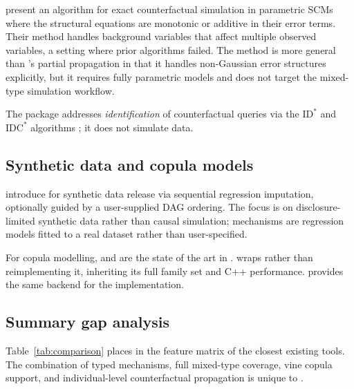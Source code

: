 \documentclass[article]{jss}
\begin{document}
\citet{karvanen2024simcf} present an algorithm for exact counterfactual simulation
in parametric SCMs where the structural equations are monotonic or additive in
their error terms. Their method handles background variables that affect multiple
observed variables, a setting where prior algorithms failed. The method is more
general than 's partial propagation in that it handles
non-Gaussian error structures explicitly, but it requires fully parametric models
and does not target the mixed-type simulation workflow.

The  package \citep{tikka2022cfid} addresses \emph{identification} of
counterfactual queries via the $\mathrm{ID}^*$ and $\mathrm{IDC}^*$ algorithms
\citep{shpitser2007id}; it does not simulate data.

\subsection{Synthetic data and copula models}

\citet{nowok2016synthpop} introduce  for synthetic data release via
sequential regression imputation, optionally guided by a user-supplied DAG ordering.
The focus is on disclosure-limited synthetic data rather than causal simulation;
mechanisms are regression models fitted to a real dataset rather than user-specified.

For copula modelling,  \citep{nagler2022rvinecopulib} and
 \citep{nagler2022rvinecopulib} are the state of the art in
.  wraps  rather than
reimplementing it, inheriting its full family set and C++ performance.
 \citep{pyvinecopulib2024} provides the same backend for the
 implementation.

\subsection{Summary gap analysis}

Table~\ref{tab:comparison} places  in the feature matrix of the
closest existing tools. The combination of typed mechanisms, full mixed-type
coverage, vine copula support, and individual-level counterfactual propagation is
unique to .
\end{document}
